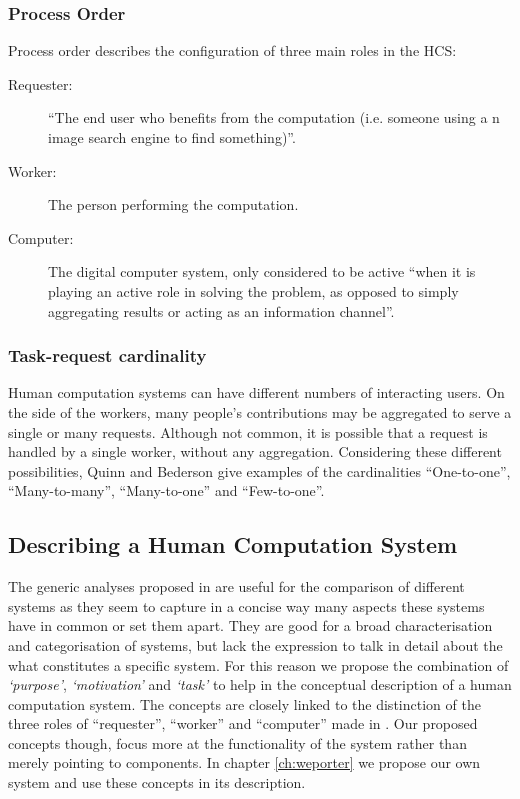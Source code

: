 \subsubsection{Process Order}
Process order describes the configuration of three main roles in the HCS\cite{Quinn:2011us}:

\begin{description}
  \item[Requester:] ``The end user who benefits from the computation (i.e. someone using a n image search engine to find something)''.
  \item[Worker:] The person performing the computation.
  \item[Computer:] The digital computer system, only considered to be active ``when it is playing an active role in solving the problem, as opposed to simply aggregating results or acting as an information channel''.
\end{description}


\subsubsection{Task-request cardinality}
Human computation systems can have different numbers of interacting users. On the side of the workers, many people's contributions may be aggregated to serve a single or many requests. Although not common, it is possible that a request is handled by a single worker, without any aggregation. Considering these different possibilities, Quinn and Bederson give examples of the cardinalities 
``One-to-one'', ``Many-to-many'', ``Many-to-one'' and ``Few-to-one''.


\subsection{Describing a Human Computation System} %
\label{sub:describing_hcs}

The generic analyses proposed in \cite{Quinn:2011us} are useful for the comparison of different systems as they seem to capture in a concise way many aspects these systems have in common or set them apart. They are good for a broad characterisation and categorisation of systems, but lack the expression to talk in detail about the what constitutes a specific system. For this reason we propose the  combination of \emph{`purpose'}, \emph{`motivation'} and \emph{`task'} to help in the conceptual description of a human computation system. The concepts are closely linked to the distinction of the three roles of ``requester'', ``worker'' and ``computer'' made in \cite{Quinn:2011us}. Our proposed concepts though, focus more at the functionality of the system rather than merely pointing to components. In chapter \ref{ch:weporter} we propose our own system and use these concepts in its description.

